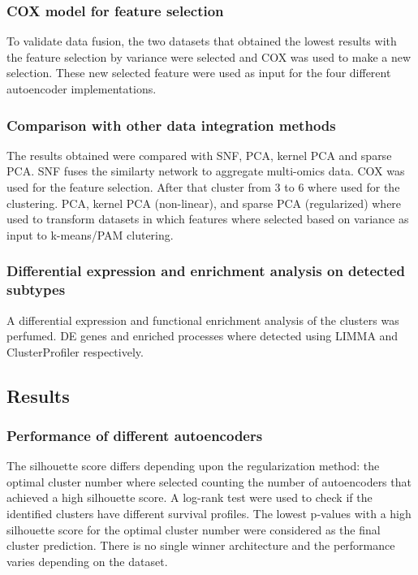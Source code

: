 		\subsubsection{COX model for feature selection}
		To validate data fusion, the two datasets that obtained the lowest results with the feature selection by variance were selected and COX was used to make a new selection.
		These new selected feature were used as input for the four different autoencoder implementations.

		\subsubsection{Comparison with other data integration methods}
		The results obtained were compared with SNF, PCA, kernel PCA and sparse PCA.
		SNF fuses the similarty network to aggregate multi-omics data.
		COX was used for the feature selection.
		After that cluster from $3$ to $6$ where used for the clustering.
		PCA, kernel PCA (non-linear), and sparse PCA (regularized) where used to transform datasets in which features where selected based on variance as input to k-means/PAM clutering.

		\subsubsection{Differential expression and enrichment analysis on detected subtypes}
		A differential expression and functional enrichment analysis of the clusters was perfumed.
		DE genes and enriched processes where detected using LIMMA and ClusterProfiler respectively.


	\subsection{Results}

		\subsubsection{Performance of different autoencoders}
		The silhouette score differs depending upon the regularization method: the optimal cluster number where selected counting the number of autoencoders that achieved a high silhouette score.
		A log-rank test were used to check if the identified clusters have different survival profiles.
		The lowest p-values with a high silhouette score for the optimal cluster number were considered as the final cluster prediction.
		There is no single winner architecture and the performance varies depending on the dataset.

